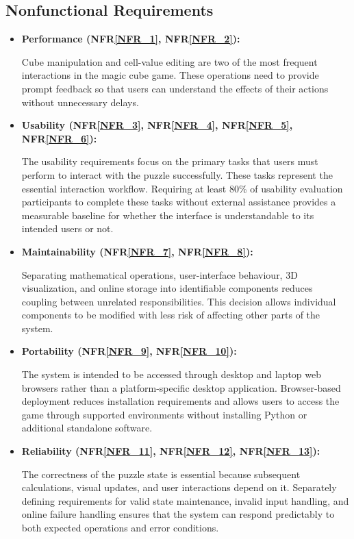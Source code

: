 \documentclass[12pt]{article}
\begin{document}
\subsection{Nonfunctional Requirements}

\begin{itemize}

\item \textbf{Performance
(NFR\ref{NFR_1},
NFR\ref{NFR_2}):}

Cube manipulation and cell-value editing are two of the most frequent
interactions in the magic cube game. These operations need to provide
prompt feedback so that users can understand the effects of their
actions without unnecessary delays.

\item \textbf{Usability
(NFR\ref{NFR_3},
NFR\ref{NFR_4},
NFR\ref{NFR_5},
NFR\ref{NFR_6}):}

The usability requirements focus on the primary tasks that users
must perform to interact with the puzzle successfully. These tasks 
represent the essential interaction workflow.
Requiring at least 80\% of usability evaluation participants to
complete these tasks without external assistance provides a
measurable baseline for whether the interface is
understandable to its intended users or not.

\item \textbf{Maintainability
(NFR\ref{NFR_7},
NFR\ref{NFR_8}):}

Separating mathematical operations, user-interface behaviour,
3D visualization, and online storage into identifiable
components reduces coupling between unrelated responsibilities.
This decision allows individual components to be modified with less
risk of affecting other parts of the system.

\item \textbf{Portability
(NFR\ref{NFR_9},
NFR\ref{NFR_10}):}

The system is intended to be accessed through desktop and laptop
web browsers rather than a platform-specific desktop application.
Browser-based deployment reduces installation requirements and
allows users to access the game through supported environments
without installing Python or additional standalone software.

\item \textbf{Reliability
(NFR\ref{NFR_11},
NFR\ref{NFR_12},
NFR\ref{NFR_13}):}

The correctness of the puzzle state is essential because subsequent
calculations, visual updates, and user interactions depend on it.
Separately defining requirements for valid state maintenance,
invalid input handling, and online failure handling ensures that
the system can respond predictably to both expected operations
and error conditions.


\end{itemize}
\end{document}
